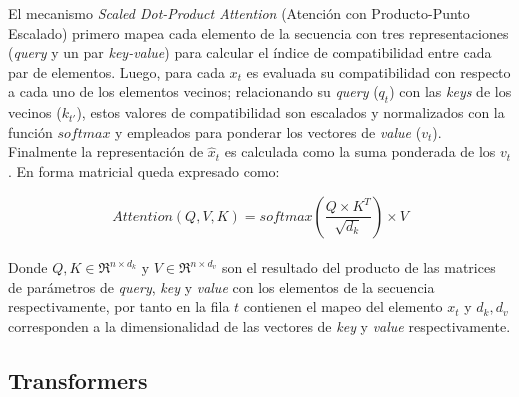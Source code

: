 		El mecanismo \textit{Scaled Dot-Product Attention} (Atención con Producto-Punto Escalado) primero mapea cada elemento de la secuencia con tres representaciones (\textit{query} y un par \textit{key-value}) para calcular el índice de compatibilidad entre cada par de elementos. Luego, para cada $x_t$ es evaluada su compatibilidad con respecto a cada uno de los  elementos vecinos; relacionando su \textit{query} ($q_t$) con las \textit{keys} de los vecinos ($k_{t'}$), estos valores de compatibilidad son escalados y normalizados con la función $softmax$ y empleados para ponderar los vectores de \textit{value} ($v_t$). Finalmente la representación de $\hat{x}_t$ es calculada como la suma ponderada de los $v_t$. En forma matricial queda expresado como:
		
		\begin{equation}
			Attention(Q, V, K) = softmax(\frac{Q\times K^T}{\sqrt{d_k}})\times V
			\label{dotP-att}
		\end{equation} \\
		Donde $Q, K \in \Re^{n\times d_k} \text{ y } V \in \Re^{n\times d_v} $ son el resultado del producto de las matrices de parámetros de \textit{query}, \textit{key} y \textit{value} con los elementos de la secuencia respectivamente, por tanto en la fila $t$ contienen el mapeo del elemento $x_t$ y  $d_k,d_v$ corresponden a la dimensionalidad de las vectores de \textit{key} y \textit{value} respectivamente.
		
\subsection{Transformers}

